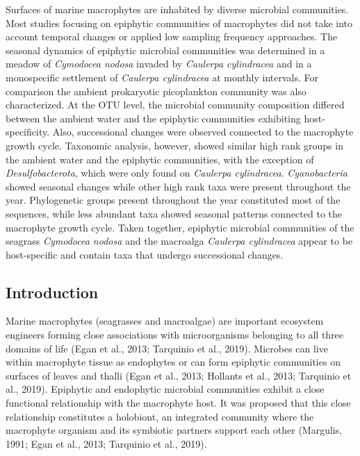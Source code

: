 \documentclass[12pt,]{article}
\begin{document}
Surfaces of marine macrophytes are inhabited by diverse microbial
communities. Most studies focusing on epiphytic communities of
macrophytes did not take into account temporal changes or applied low
sampling frequency approaches. The seasonal dynamics of epiphytic
microbial communities was determined in a meadow of \emph{Cymodocea
nodosa} invaded by \emph{Caulerpa cylindracea} and in a monospecific
settlement of \emph{Caulerpa cylindracea} at monthly intervals. For
comparison the ambient prokaryotic picoplankton community was also
characterized. At the OTU level, the microbial community composition
differed between the ambient water and the epiphytic communities
exhibiting host-specificity. Also, successional changes were observed
connected to the macrophyte growth cycle. Taxonomic analysis, however,
showed similar high rank groups in the ambient water and the epiphytic
communities, with the exception of \emph{Desulfobacterota}, which were
only found on \emph{Caulerpa cylindracea}. \emph{Cyanobacteria} showed
seasonal changes while other high rank taxa were present throughout the
year. Phylogenetic groups present throughout the year constituted most
of the sequences, while less abundant taxa showed seasonal patterns
connected to the macrophyte growth cycle. Taken together, epiphytic
microbial communities of the seagrass \emph{Cymodocea nodosa} and the
macroalga \emph{Caulerpa cylindracea} appear to be host-specific and
contain taxa that undergo successional changes.

\newpage

\hypertarget{introduction}{%
\subsection{Introduction}\label{introduction}}

Marine macrophytes (seagrasses and macroalgae) are important ecosystem
engineers forming close associations with microorganisms belonging to
all three domains of life (Egan et al., 2013; Tarquinio et al., 2019).
Microbes can live within macrophyte tissue as endophytes or can form
epiphytic communities on surfaces of leaves and thalli (Egan et al.,
2013; Hollants et al., 2013; Tarquinio et al., 2019). Epiphytic and
endophytic microbial communities exhibit a close functional relationship
with the macrophyte host. It was proposed that this close relationship
constitutes a holobiont, an integrated community where the macrophyte
organism and its symbiotic partners support each other (Margulis, 1991;
Egan et al., 2013; Tarquinio et al., 2019).
\end{document}

